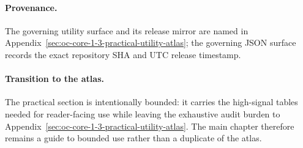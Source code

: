 \paragraph{Provenance.}
The governing utility surface and its release mirror are named in
Appendix~\ref{sec:oc-core-1-3-practical-utility-atlas}; the governing JSON
surface records the exact repository SHA and UTC release timestamp.

\begingroup
\small

\endgroup

\paragraph{Transition to the atlas.}
The practical section is intentionally bounded: it carries the high-signal
tables needed for reader-facing use while leaving the exhaustive audit burden
to Appendix~\ref{sec:oc-core-1-3-practical-utility-atlas}. The main chapter
therefore remains a guide to bounded use rather than a duplicate of the atlas.
